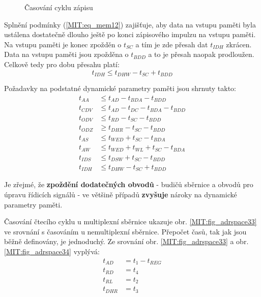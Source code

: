         \begin{figure}[ht!]
          \centering  
          \caption{Časování cyklu zápisu}
          \label{MIT:fig_sbernice3132}
        \end{figure}
        
        Splnění podmínky (\ref{MIT:eq_mem12}) zajišťuje, aby data na vstupu paměti byla ustálena 
        dostatečně dlouho ještě po konci zápisového impulzu na vstupu  
        paměti. Na vstupu paměti je konec  zpožděn o \(t_{SC}\) a tím je 
        zde přesah dat \(t_{IDH}\) zkrácen. Data na vstupu paměti jsou zpožděna o \(t_{BDD}\) a to 
        je přesah naopak prodloužen. Celkově tedy pro dobu přesahu platí:
        \begin{equation}\label{MIT:eq_mem12}
          t_{IDH} \leq t_{DHW} - t_{SC} + t_{BDD} 
        \end{equation}
        
        Požadavky na podstatné dynamické parametry paměti jsou shrnuty takto:
        \begin{align*}
          t_{AA}  & \leq t_{AD}  - t_{BDA} - t_{BDD}              \\
          t_{CDV} & \leq t_{AD}  - t_{DC}  - t_{BDA} - t_{BDD}    \\
          t_{ODV} & \leq t_{RD}  - t_{SC}  - t_{BDD}              \\
          t_{ODZ} & \geq t_{DHR} - t_{SC}  - t_{BDD}              \\ 
          t_{AS}  & \leq t_{WED} + t_{SC}  - t_{BDA}              \\
          t_{AW}  & \leq t_{WED} + t_{WL}  + t_{SC}  - t_{BDA}    \\
          t_{IDS} & \leq t_{DSW} + t_{SC}  - t_{BDD}              \\
          t_{IDH} & \leq t_{DHW} - t_{SC}  + t_{BDD}
        \end{align*}
        
        Je zřejmé, že \textbf{zpoždění dodatečných obvodů} - budičů sběrnice a obvodů pro úpravu 
        řídicích signálů - ve většině případů \textbf{zvyšuje} nároky na dynamické parametry paměti.
        
        Časování čtecího cyklu u multiplexní sběrnice ukazuje obr. \ref{MIT:fig_adrspace33} ve 
        srovnání s časováním u nemultiplexní sběrnice. Přepočet časů, tak jak jsou běžně 
        definovány, je jednoduchý. Ze srovnání obr. \ref{MIT:fig_adrspace33} a obr. 
        \ref{MIT:fig_adrspace34} vyplývá:
        \begin{align*}
          t_{AD}  &= t_1 - t_{REG}  \\
          t_{RD}  &= t_4            \\
          t_{RL}  &= t_2            \\
          t_{DHR} &= t_3            
        \end{align*}
        
